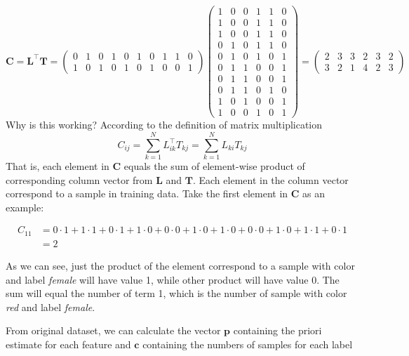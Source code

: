 \documentclass[a4paper]{article}
\newcommand{\matr}[1]{\mathbf{#1}}
\renewcommand{\vec}[1]{\mathbf{#1}}
\begin{document}
			\[
				\matr{C} = \matr{L}^\top \matr{T} = 
				\begin{pmatrix}
					0 & 1 & 0 & 1 & 0 & 1 & 0 & 1 & 1 & 0 \\
					1 & 0 & 1 & 0 & 1 & 0 & 1 & 0 & 0 & 1
				\end{pmatrix}
				\begin{pmatrix}
					1 & 0 & 0 & 1 & 1 & 0 \\
					1 & 0 & 0 & 1 & 1 & 0 \\
					1 & 0 & 0 & 1 & 1 & 0 \\
					0 & 1 & 0 & 1 & 1 & 0 \\
					0 & 1 & 0 & 1 & 0 & 1 \\
					0 & 1 & 1 & 0 & 0 & 1 \\
					0 & 1 & 1 & 0 & 0 & 1 \\
					0 & 1 & 1 & 0 & 1 & 0 \\
					1 & 0 & 1 & 0 & 0 & 1 \\
					1 & 0 & 0 & 1 & 0 & 1
				\end{pmatrix}
				=
				\begin{pmatrix}
					2 & 3 & 3 & 2 & 3 & 2 \\
					3 & 2 & 1 & 4 & 2 & 3
				\end{pmatrix}
			\]
			Why is this working? According to the definition of matrix multiplication
			\[
				C_{ij} = \sum_{k=1}^N L^\top_{ik} T_{kj} = \sum_{k=1}^N L_{ki} T_{kj}
			\]
			That is, each element in $\matr{C}$ equals the sum of element-wise product of
			corresponding column vector from $\matr{L}$ and $\matr{T}$. Each element
			in the column vector correspond to a sample in training data. Take the
			first element
			in $\matr{C}$ as an example:

			\begin{align*}
				C_{11}
					 &=0 \cdot 1 + 1 \cdot 1 + 0 \cdot 1 + 1 \cdot 0 + 0 \cdot 0 + 1 \cdot 0 +
				1 \cdot 0 + 0 \cdot 0 + 1 \cdot 0 + 1 \cdot 1 + 0 \cdot 1 \\
				&= 2
			\end{align*}
			
			As we can see, just the product of the element correspond to a sample with
			color  and label \textit{female}
			will have value 1, while other product will have value 0. The sum will
			equal the number of term 1, which is the number of sample with color
			\textit{red} and label \textit{female}.

			From original dataset, we can calculate the vector $\vec{p}$ containing
			the priori estimate for each feature and $\vec{c}$ containing the numbers
			of samples for each label
\end{document}
